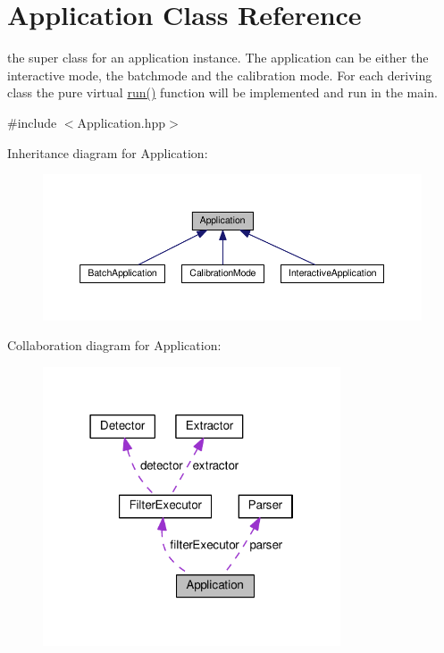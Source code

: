 \hypertarget{classApplication}{}\section{Application Class Reference}
\label{classApplication}


the super class for an application instance. The application can be either the interactive mode, the batchmode and the calibration mode. For each deriving class the pure virtual \hyperlink{classApplication_a7dd8e91a715194dd391be7ae3ecdd985}{run()} function will be implemented and run in the main.  




{\ttfamily \#include $<$Application.\+hpp$>$}



Inheritance diagram for Application\+:\nopagebreak
\begin{figure}[H]
\begin{center}
\leavevmode
\includegraphics[width=350pt]{classApplication__inherit__graph}
\end{center}
\end{figure}


Collaboration diagram for Application\+:\nopagebreak
\begin{figure}[H]
\begin{center}
\leavevmode
\includegraphics[width=250pt]{classApplication__coll__graph}
\end{center}
\end{figure}
